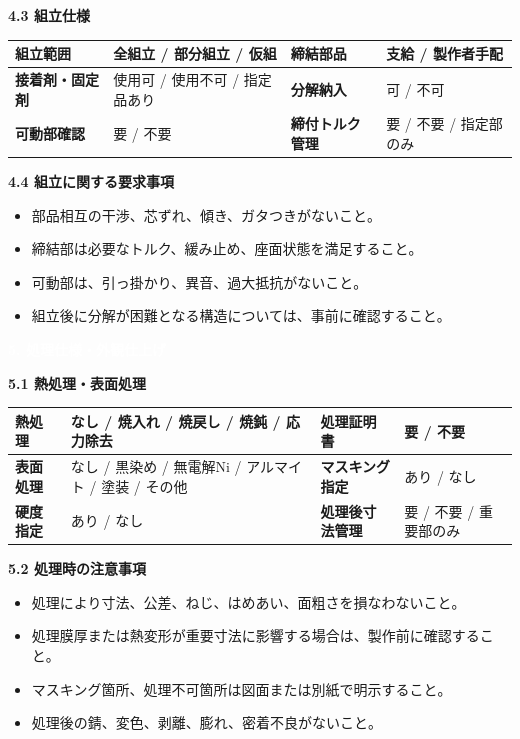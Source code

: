 \documentclass[a4paper,10pt]{ltjsarticle}
\makeatletter
\newlength{\SpecBodyWidth}
\newcommand{\PageTitle}[1]{%
  \vspace*{2mm}%
  \noindent\colorbox{SpecHead}{%
    \parbox{\dimexpr\SpecBodyWidth-2\fboxsep\relax}{%
      \large\bfseries\textcolor{white}{#1}%
    }%
  }%
  \par\vspace{5mm}%
}
\newcommand{\BlockTitle}[1]{%
  \vspace{4mm}%
  \noindent\colorbox{SpecSoft}{%
    \parbox{\dimexpr\SpecBodyWidth-2\fboxsep\relax}{%
      \normalsize\bfseries\textcolor{SpecHead}{#1}%
    }%
  }%
  \par\vspace{1.5mm}%
}
\newenvironment{SpecTable}[1]{%
  \par\vspace{1mm}%
  \noindent\footnotesize%
  \renewcommand{\arraystretch}{1.10}%
  \setlength{\tabcolsep}{3.0pt}%
  \begin{tabular*}{\SpecBodyWidth}{@{\extracolsep{\fill}}#1@{}}%
}{%
  \end{tabular*}%
  \par\vspace{1.5mm}%
}
\newcommand{\Lab}[1]{\textbf{\textcolor{SpecHead}{#1}}}
\newcommand{\YN}{要 / 不要}
\makeatother
\begin{document}
\BlockTitle{4.3 組立仕様}
\begin{SpecTable}{|p{28mm}|p{43mm}|p{30mm}|p{43mm}|}
\hline
\Lab{組立範囲} & 全組立 / 部分組立 / 仮組 & \Lab{締結部品} & 支給 / 製作者手配 \\
\hline
\Lab{接着剤・固定剤} & 使用可 / 使用不可 / 指定品あり & \Lab{分解納入} & 可 / 不可 \\
\hline
\Lab{可動部確認} & \YN & \Lab{締付トルク管理} & 要 / 不要 / 指定部のみ \\
\hline
\end{SpecTable}

\BlockTitle{4.4 組立に関する要求事項}
\begin{itemize}
  \item 部品相互の干渉、芯ずれ、傾き、ガタつきがないこと。
  \item 締結部は必要なトルク、緩み止め、座面状態を満足すること。
  \item 可動部は、引っ掛かり、異音、過大抵抗がないこと。
  \item 組立後に分解が困難となる構造については、事前に確認すること。
\end{itemize}

\clearpage

\PageTitle{5. 処理仕様・外観仕上げ}

\BlockTitle{5.1 熱処理・表面処理}
\begin{SpecTable}{|p{28mm}|p{43mm}|p{30mm}|p{43mm}|}
\hline
\Lab{熱処理} & なし / 焼入れ / 焼戻し / 焼鈍 / 応力除去 & \Lab{処理証明書} & \YN \\
\hline
\Lab{表面処理} & なし / 黒染め / 無電解Ni / アルマイト / 塗装 / その他 & \Lab{マスキング指定} & あり / なし \\
\hline
\Lab{硬度指定} & あり / なし & \Lab{処理後寸法管理} & 要 / 不要 / 重要部のみ \\
\hline
\end{SpecTable}

\BlockTitle{5.2 処理時の注意事項}
\begin{itemize}
  \item 処理により寸法、公差、ねじ、はめあい、面粗さを損なわないこと。
  \item 処理膜厚または熱変形が重要寸法に影響する場合は、製作前に確認すること。
  \item マスキング箇所、処理不可箇所は図面または別紙で明示すること。
  \item 処理後の錆、変色、剥離、膨れ、密着不良がないこと。
\end{itemize}
\end{document}
